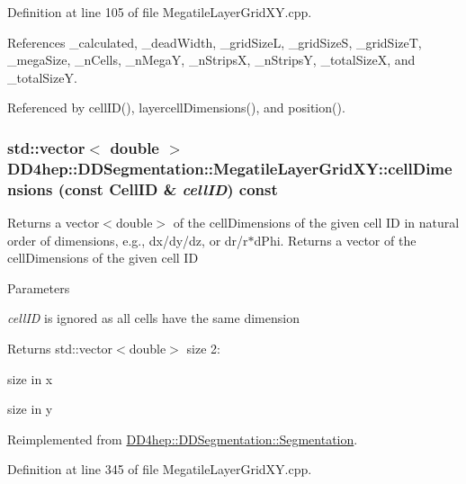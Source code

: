 Definition at line 105 of file MegatileLayerGridXY.cpp.

References \_\-calculated, \_\-deadWidth, \_\-gridSizeL, \_\-gridSizeS, \_\-gridSizeT, \_\-megaSize, \_\-nCells, \_\-nMegaY, \_\-nStripsX, \_\-nStripsY, \_\-totalSizeX, and \_\-totalSizeY.

Referenced by cellID(), layercellDimensions(), and position().\hypertarget{class_d_d4hep_1_1_d_d_segmentation_1_1_megatile_layer_grid_x_y_a43b169f4cb6546098e427c6d43db66cf}{
\subsubsection[{cellDimensions}]{\setlength{\rightskip}{0pt plus 5cm}std::vector$<$ double $>$ DD4hep::DDSegmentation::MegatileLayerGridXY::cellDimensions (const {\bf CellID} \& {\em cellID}) const}}
\label{class_d_d4hep_1_1_d_d_segmentation_1_1_megatile_layer_grid_x_y_a43b169f4cb6546098e427c6d43db66cf}


Returns a vector$<$double$>$ of the cellDimensions of the given cell ID in natural order of dimensions, e.g., dx/dy/dz, or dr/r$\ast$dPhi. Returns a vector of the cellDimensions of the given cell ID 
\begin{DoxyParams}{Parameters}
\item[{\em cellID}]is ignored as all cells have the same dimension \end{DoxyParams}
\begin{DoxyReturn}{Returns}
std::vector$<$double$>$ size 2:
\begin{DoxyEnumerate}
\item size in x
\item size in y 
\end{DoxyEnumerate}
\end{DoxyReturn}


Reimplemented from \hyperlink{class_d_d4hep_1_1_d_d_segmentation_1_1_segmentation_a9710f4942d7f6b52ae5342652e17c88d}{DD4hep::DDSegmentation::Segmentation}.

Definition at line 345 of file MegatileLayerGridXY.cpp.


